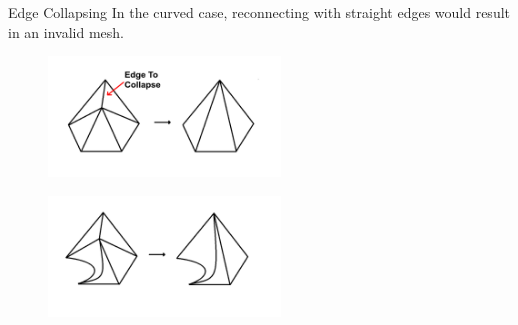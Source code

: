 \documentclass[12pt]{beamer}
\begin{document}
\begin{frame}{Edge Collapsing}
In the curved case, reconnecting with straight edges would result in an invalid mesh.
\begin{figure}
  \centering
  \includegraphics[width=0.55\textwidth]{bezier_images/collapse1.png} 
\end{figure}
\begin{figure}
  \centering
  \includegraphics[width=0.55\textwidth]{bezier_images/collapse2.png} 
\end{figure}
\end{frame}
\end{document}
